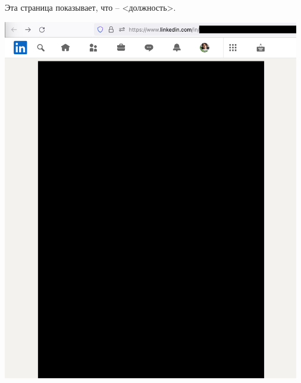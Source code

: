 
Эта страница показывает, что \MrCalltouch -- <должность>.

\begin{center}
    \includegraphics[width=35em]{calltouch-linkedin-p1_public}
\end{center}
\WillContinue
\pagebreak

